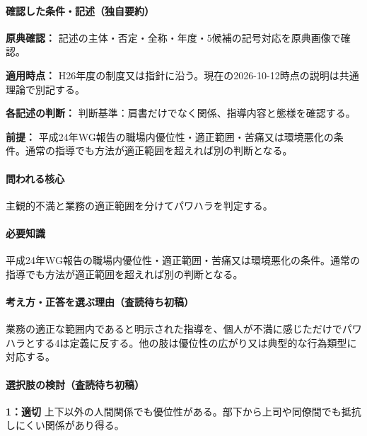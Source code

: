 \paragraph{確認した条件・記述（独自要約）}\mbox{}\par

\noindent\textbf{原典確認：} 記述の主体・否定・全称・年度・5候補の記号対応を原典画像で確認。\par

\noindent\textbf{適用時点：} H26年度の制度又は指針に沿う。現在の2026-10-12時点の説明は共通理論で別記する。\par

\noindent\textbf{各記述の判断：} 判断基準：肩書だけでなく関係、指導内容と態様を確認する。\par

\noindent\textbf{前提：} 平成24年WG報告の職場内優位性・適正範囲・苦痛又は環境悪化の条件。通常の指導でも方法が適正範囲を超えれば別の判断となる。\par

\paragraph{問われる核心} 主観的不満と業務の適正範囲を分けてパワハラを判定する。

\paragraph{必要知識} 平成24年WG報告の職場内優位性・適正範囲・苦痛又は環境悪化の条件。通常の指導でも方法が適正範囲を超えれば別の判断となる。

\paragraph{考え方・正答を選ぶ理由（査読待ち初稿）} 業務の適正な範囲内であると明示された指導を、個人が不満に感じただけでパワハラとする4は定義に反する。他の肢は優位性の広がり又は典型的な行為類型に対応する。

\paragraph{選択肢の検討（査読待ち初稿）}\mbox{}\par

\noindent\textbf{1：適切} 上下以外の人間関係でも優位性がある。部下から上司や同僚間でも抵抗しにくい関係があり得る。\par

